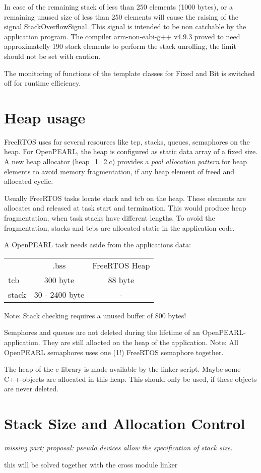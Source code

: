 In case of the remaining stack of less than 250 elements (1000 bytes), or a
remaining unused size of less than 250 elements will cause the raising
of the signal StackOverflowSignal. This signal is intended to be non catchable
by the application program. 
The compiler arm-non-eabi-g++ v4.9.3 proved to need approximatelly 190 stack elements to perform the stack unrolling, the limit should not be set with caution.

The monitoring of functions of the template classes for Fixed and Bit 
is switched off for runtime efficiency.

\section{Heap usage}
FreeRTOS uses for several resources like tcp, stacks, queues, semaphores 
on the heap.
For OpenPEARL, the heap is configured as static data array of a fixed size.
A new heap allocator (heap\_1\_2.c) provides a {\em pool allocation pattern}
for heap elements to avoid memory fragmentation, if any heap element
of freed and allocated cyclic.

Usually FreeRTOS tasks locate stack and tcb on the heap. 
These elements are allocates and released at task start and termination.
This would produce heap fragmentation, when task stacks have different lengths.
To avoid the fragmentation, stacks and tcbs are allocated static in the
application code.

A OpenPEARL task needs aside from the applications data:

\begin{tabular}{lcc}
    & .bss & FreeRTOS Heap \\
tcb & 300 byte & 88 byte \\
stack & 30 - 2400 byte & - \\
\end{tabular} 

Note: Stack checking requires a unused buffer of 800 bytes!

Semphores and queues are not deleted during the lifetime of an 
OpenPEARL-application. They are still allocted on the heap of the application.
Note: All OpenPEARL semaphores uses one (1!) FreeRTOS semaphore together.

The heap of the c-library is made available by the linker script. 
Maybe some C++-objects are allocated in this heap.
This should only be used, if these objects are never deleted.


\section{Stack Size and Allocation Control}
{\em missing part; 
proposal: pseudo devices allow the specification of stack size.

this will be solved together with the cross module linker
}

